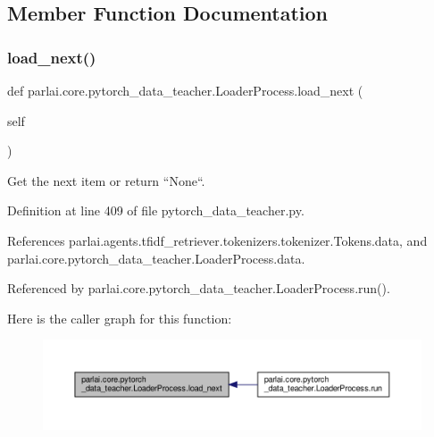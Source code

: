 \subsection{Member Function Documentation}
\mbox{\label{classparlai_1_1core_1_1pytorch__data__teacher_1_1LoaderProcess_ac22783ccf0ae30d6c7de23e5dc73792b}} 
\subsubsection{\texorpdfstring{load\+\_\+next()}{load\_next()}}
{\footnotesize\ttfamily def parlai.\+core.\+pytorch\+\_\+data\+\_\+teacher.\+Loader\+Process.\+load\+\_\+next (\begin{DoxyParamCaption}\item[{}]{self }\end{DoxyParamCaption})}

\begin{DoxyVerb}Get the next item or return ``None``.\end{DoxyVerb}
 

Definition at line 409 of file pytorch\+\_\+data\+\_\+teacher.\+py.



References parlai.\+agents.\+tfidf\+\_\+retriever.\+tokenizers.\+tokenizer.\+Tokens.\+data, and parlai.\+core.\+pytorch\+\_\+data\+\_\+teacher.\+Loader\+Process.\+data.



Referenced by parlai.\+core.\+pytorch\+\_\+data\+\_\+teacher.\+Loader\+Process.\+run().

Here is the caller graph for this function\+:
\nopagebreak
\begin{figure}[H]
\begin{center}
\leavevmode
\includegraphics[width=350pt]{classparlai_1_1core_1_1pytorch__data__teacher_1_1LoaderProcess_ac22783ccf0ae30d6c7de23e5dc73792b_icgraph}
\end{center}
\end{figure}
\mbox{\label{classparlai_1_1core_1_1pytorch__data__teacher_1_1LoaderProcess_a741c7edb04daec4d8623987b3de4406a}} 
